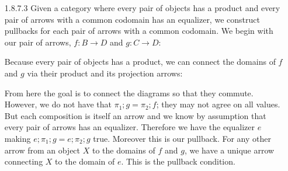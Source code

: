 \documentclass{article}
\begin{document}
\begin{enumerate}
\newpage
\item [1.8.7.3]
  Given a category where every pair of objects has a product and every pair of arrows with a common codomain has an equalizer, we construct pullbacks for each pair of arrows with a common codomain.
  We begin with our pair of arrows, $f : B \rightarrow D$ and $g : C \rightarrow D$:
  \begin{center}
  \end{center}
  Because every pair of objects has a product, we can connect the domains of $f$ and $g$ via their product and its projection arrows:
  \begin{center}
  \end{center}
  From here the goal is to connect the diagrams so that they commute.
  However, we do not have that $\pi_1; g = \pi_2; f$; they may not agree on all values.
  But each composition is itself an arrow and we know by assumption that every pair of arrows has an equalizer.
  Therefore we have the equalizer $e$ making $e; \pi_1; g = e; \pi_2; g$ true.
  Moreover this is our pullback.
  For any other arrow from an object $X$ to the domains of $f$ and $g$, we have a unique arrow connecting $X$ to the domain of $e$.
  This is the pullback condition.
  \begin{center}
  \end{center}


\end{enumerate}
\end{document}
